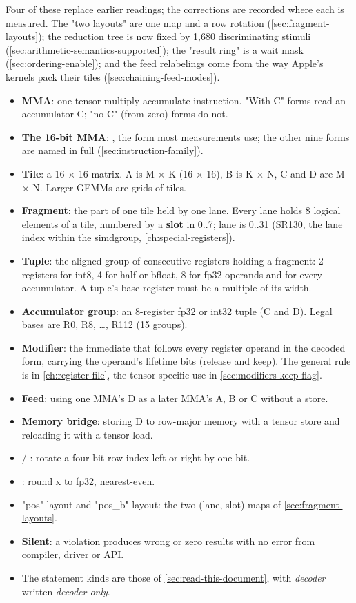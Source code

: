 Four of these replace earlier readings; the corrections are recorded where each is measured. The "two layouts" are
one map and a row rotation (\cref{sec:fragment-layouts}); the reduction tree is now fixed by 1,680 discriminating stimuli
(\cref{sec:arithmetic-semantics-supported}); the "result ring" is a wait mask (\cref{sec:ordering-enable}); and the feed
relabelings come from the way Apple's kernels pack their tiles (\cref{sec:chaining-feed-modes}).


\begin{itemize}
\item \textbf{MMA}: one tensor multiply-accumulate instruction. "With-C" forms read an accumulator C; "no-C" (from-zero) forms
  do not.
\item \textbf{The 16-bit MMA}: , the form most measurements use; the other
  nine forms are named in full (\cref{sec:instruction-family}).
\item \textbf{Tile}: a 16 × 16 matrix. A is M × K (16 × 16), B is K × N, C and D are M × N. Larger GEMMs are grids of tiles.
\item \textbf{Fragment}: the part of one tile held by one lane. Every lane holds 8 logical elements of a tile, numbered by a
  \textbf{slot}  in 0..7; lane  is 0..31 (SR130, the lane index within the simdgroup, \cref{ch:special-registers}).
\item \textbf{Tuple}: the aligned group of consecutive registers holding a fragment: 2 registers for int8, 4 for half or
  bfloat, 8 for fp32 operands and for every accumulator. A tuple's base register must be a multiple of its width.
\item \textbf{Accumulator group}: an 8-register fp32 or int32 tuple (C and D). Legal bases are R0, R8, \dots{}, R112 (15 groups).
\item \textbf{Modifier}: the immediate that follows every register operand in the decoded form, carrying the operand's
  lifetime bits (release and keep). The general rule is in \cref{ch:register-file}, the tensor-specific use in \cref{sec:modifiers-keep-flag}.
\item \textbf{Feed}: using one MMA's D as a later MMA's A, B or C without a store.
\item \textbf{Memory bridge}: storing D to row-major memory with a tensor store and reloading it with a tensor load.
\item {} / : rotate a four-bit row index left or right by one bit.
\item {}: round x to fp32, nearest-even.
\item "pos" layout and "pos\_b" layout: the two (lane, slot) maps of \cref{sec:fragment-layouts}.
\item \textbf{Silent}: a violation produces wrong or zero results with no error from compiler, driver or API.
\item The statement kinds are those of \cref{sec:read-this-document}, with \emph{decoder} written \emph{decoder only}.
\end{itemize}

